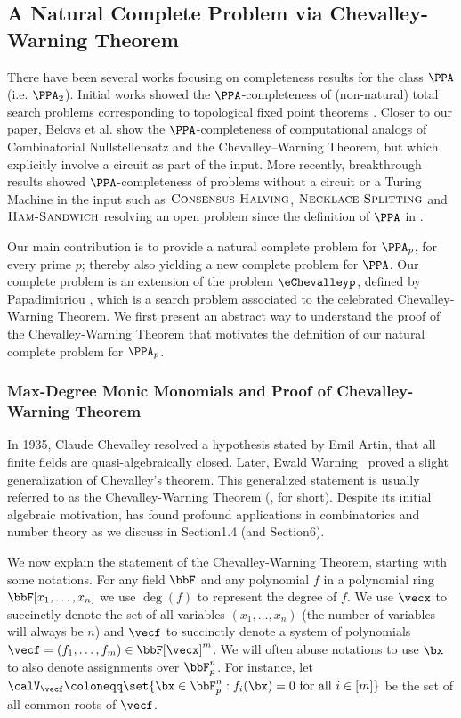 \setcounter{section}{1}
\setcounter{subsection}{1}
\setcounter{theorem}{1}
\subsection{A Natural Complete Problem via Chevalley-Warning Theorem}
\label{sec:intro-complete}

There have been several works focusing on completeness results for the class $\PPA$ (i.e. $\PPA_2$). Initial works showed the
$\PPA$-completeness of (non-natural) total search problems corresponding to topological fixed point theorems
\cite{r24,r1,r19}. Closer to our paper,
Belovs et al. \cite{r8} show the $\PPA$-completeness of computational analogs of Combinatorial Nullstellensatz and the Chevalley--Warning Theorem, but which explicitly
involve a circuit as part of the input. More recently, breakthrough results
showed $\PPA$-completeness of problems without a circuit or a Turing Machine in
the input such as $\textsc{Consensus-Halving}$, $\textsc{Necklace-Splitting}$
and $\textsc{Ham-Sandwich}$
\cite{r20,r21} resolving an open
problem since the definition of $\PPA$ in \cite{r33}.

  Our main contribution is to provide a natural complete problem for $\PPA_p$,
for every prime $p$; thereby also yielding a new complete problem for $\PPA$.
Our complete problem is an extension of the problem $\eChevalleyp$, defined by
Papadimitriou \cite{r33}, which is a search problem
associated to the celebrated Chevalley-Warning Theorem. We first
present an abstract way to understand the proof of the Chevalley-Warning Theorem
that motivates the definition of our natural complete problem for
$\PPA_p$.

\subsubsection{Max-Degree Monic Monomials and Proof of Chevalley-Warning Theorem} \label{sec:maximum-degree}

  In 1935, Claude Chevalley \cite{r15} resolved a
hypothesis stated by Emil Artin, that all finite fields are quasi-algebraically
closed. Later, Ewald Warning~\cite{r37}
proved a slight generalization of Chevalley's theorem. This
generalized statement is usually referred to as the Chevalley-Warning Theorem
(\CWT, for short). Despite its initial algebraic motivation, \CWT has found
profound applications in combinatorics and number theory as we discuss in
Section1.4 (and Section6).

We now explain the statement of the Chevalley-Warning Theorem, starting with some notations. For any field $\bbF$ and any polynomial $f$ in a polynomial ring $\bbF[x_1, \ldots, x_n]$ we use $\deg(f)$ to represent the degree of $f$. We use $\vecx$ to succinctly denote the set of all variables $(x_1, \ldots, x_n)$ (the number of variables will always be $n$) and $\vecf$ to succinctly denote a system of polynomials $\vecf = (f_1, \ldots, f_m) \in \bbF[\vecx]^m$. We will often abuse notations to use $\bx$ to also denote assignments over $\bbF_p^n$. For instance, let $\calV_{\vecf} \coloneqq \set{\bx \in \bbF_p^n : f_i(\bx) = 0 \text{ for all } i \in [m]}$ be the set of all common roots of $\vecf$.

